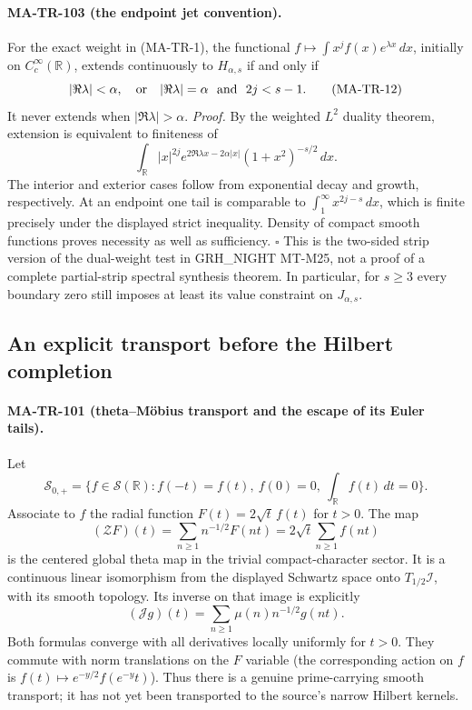 \paragraph{MA-TR-103 (the endpoint jet convention).}
For the exact weight in (MA-TR-1), the functional
$f\mapsto\int x^j f(x)e^{\lambda x}\,dx$, initially on
$C_c^\infty(\mathbb R)$, extends continuously to $H_{\alpha,s}$
if and only if
\[
 |\Re\lambda|<\alpha,
 \quad\hbox{or}\quad
 |\Re\lambda|=\alpha\ \hbox{ and }\ 2j<s-1.
 \tag{MA-TR-12}
\]
It never extends when $|\Re\lambda|>\alpha$.
\emph{Proof.} By the weighted $L^2$ duality theorem, extension
is equivalent to finiteness of
\[
 \int_{\mathbb R}|x|^{2j}
        e^{2\Re\lambda x-2\alpha|x|}(1+x^2)^{-s/2}\,dx.
\]
The interior and exterior cases follow from exponential decay
and growth, respectively. At an endpoint one tail is comparable
to $\int_1^\infty x^{2j-s}\,dx$, which is finite precisely
under the displayed strict inequality. Density of compact smooth
functions proves necessity as well as sufficiency.
\hfill$\square$
This is the two-sided strip version of the dual-weight test in
GRH\_NIGHT MT-M25, not a proof of a complete partial-strip
spectral synthesis theorem. In particular, for $s\ge3$ every
boundary zero still imposes at least its value constraint on
$J_{\alpha,s}$.

\subsection{An explicit transport before the Hilbert completion}

\paragraph{MA-TR-101 (theta--M\"obius transport and the escape of its Euler tails).}
Let
\[
 \mathscr S_{0,+}=\{f\in\mathscr S(\mathbb R):
          f(-t)=f(t),\ f(0)=0,\ \int_{\mathbb R}f(t)\,dt=0\}.
\]
Associate to $f$ the radial function $F(t)=2\sqrt t\,f(t)$ for $t>0$.
The map
\[
 (\mathcal ZF)(t)=\sum_{n\ge1}n^{-1/2}F(nt)
                 =2\sqrt t\sum_{n\ge1}f(nt)
 \tag{MA-TR-6}
\]
is the centered global theta map in the trivial compact-character
sector. It is a continuous linear isomorphism from the displayed
Schwartz space onto $T_{1/2}\mathcal I$, with its smooth topology.
Its inverse on that image is explicitly
\[
 (\mathcal Jg)(t)=\sum_{n\ge1}\mu(n)n^{-1/2}g(nt).
 \tag{MA-TR-7}
\]
Both formulas converge with all derivatives locally uniformly for
$t>0$. They commute with norm translations on the $F$ variable
(the corresponding action on $f$ is
$f(t)\mapsto e^{-y/2}f(e^{-y}t)$). Thus there is a genuine
prime-carrying smooth transport; it has not yet been transported to
the source's narrow Hilbert kernels.

